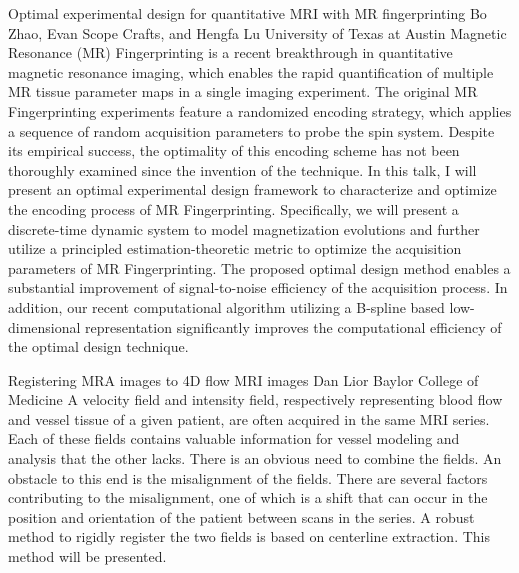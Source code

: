 \begin{addmargin}[2em]{0em}
\vspace{1.5ex}
\abs
{Optimal experimental design for quantitative MRI with MR fingerprinting}
{Bo Zhao, Evan Scope Crafts, and Hengfa Lu}
{University of Texas at Austin}
{Magnetic Resonance (MR) Fingerprinting is a recent breakthrough in quantitative magnetic resonance imaging, which enables the rapid quantification of multiple MR tissue parameter maps in a single imaging experiment. The original MR Fingerprinting experiments feature a randomized encoding strategy, which applies a sequence of random acquisition parameters to probe the spin system. Despite its empirical success, the optimality of this encoding scheme has not been thoroughly examined since the invention of the technique. In this talk, I will present an optimal experimental design framework to characterize and optimize the encoding process of MR Fingerprinting. Specifically, we will present a discrete-time dynamic system to model magnetization evolutions and further utilize a principled estimation-theoretic metric to optimize the acquisition parameters of MR Fingerprinting. The proposed optimal design method enables a substantial improvement of signal-to-noise efficiency of the acquisition process. In addition, our recent computational algorithm utilizing a B-spline based low-dimensional representation significantly improves the computational efficiency of the optimal design technique.}


\vspace{1.5ex}
\abs
{Registering MRA images to 4D flow MRI images}
{Dan Lior}
{Baylor College of Medicine}
{A velocity field and intensity field, respectively representing blood flow and vessel tissue of a given patient, are often acquired in the same MRI series. Each of these fields contains valuable information for vessel modeling and analysis that the other lacks. There is an obvious need to combine the fields. An obstacle to this end is the misalignment of the fields. There are several factors contributing to the misalignment, one of which is a shift that can occur in the position and orientation of the patient between scans in the series. A robust method to rigidly register the two fields is based on centerline extraction. This method will be presented.}



\end{addmargin}
